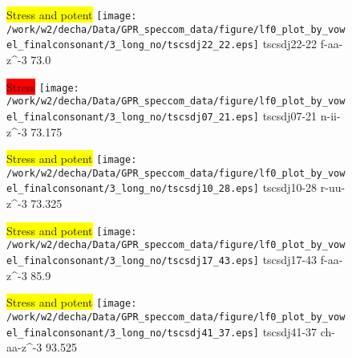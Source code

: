 \documentclass{article}
\begin{document}
\begin{figure}[t]
\begin{minipage}[b]{.24\textwidth}
\colorbox{yellow}{Stress and potent}
\centering
\texttt{[image: /work/w2/decha/Data/GPR\_speccom\_data/figure/lf0\_plot\_by\_vowel\_finalconsonant/3\_long\_no/tscsdj22\_22.eps]}
tscsdj22-22 f-aa-z\textasciicircum-3 73.0
\end{minipage}
\begin{minipage}[b]{.24\textwidth}
\colorbox{red}{Stress}
\centering
\texttt{[image: /work/w2/decha/Data/GPR\_speccom\_data/figure/lf0\_plot\_by\_vowel\_finalconsonant/3\_long\_no/tscsdj07\_21.eps]}
tscsdj07-21 n-ii-z\textasciicircum-3 73.175
\end{minipage}
\begin{minipage}[b]{.24\textwidth}
\colorbox{yellow}{Stress and potent}
\centering
\texttt{[image: /work/w2/decha/Data/GPR\_speccom\_data/figure/lf0\_plot\_by\_vowel\_finalconsonant/3\_long\_no/tscsdj10\_28.eps]}
tscsdj10-28 r-uu-z\textasciicircum-3 73.325
\end{minipage}
\begin{minipage}[b]{.24\textwidth}
\colorbox{yellow}{Stress and potent}
\centering
\texttt{[image: /work/w2/decha/Data/GPR\_speccom\_data/figure/lf0\_plot\_by\_vowel\_finalconsonant/3\_long\_no/tscsdj17\_43.eps]}
tscsdj17-43 f-aa-z\textasciicircum-3 85.9
\end{minipage}
\end{figure}
\clearpage
\begin{figure}[t]
\begin{minipage}[b]{.24\textwidth}
\colorbox{yellow}{Stress and potent}
\centering
\texttt{[image: /work/w2/decha/Data/GPR\_speccom\_data/figure/lf0\_plot\_by\_vowel\_finalconsonant/3\_long\_no/tscsdj41\_37.eps]}
tscsdj41-37 ch-aa-z\textasciicircum-3 93.525
\end{minipage}
\end{figure}
\end{document}
